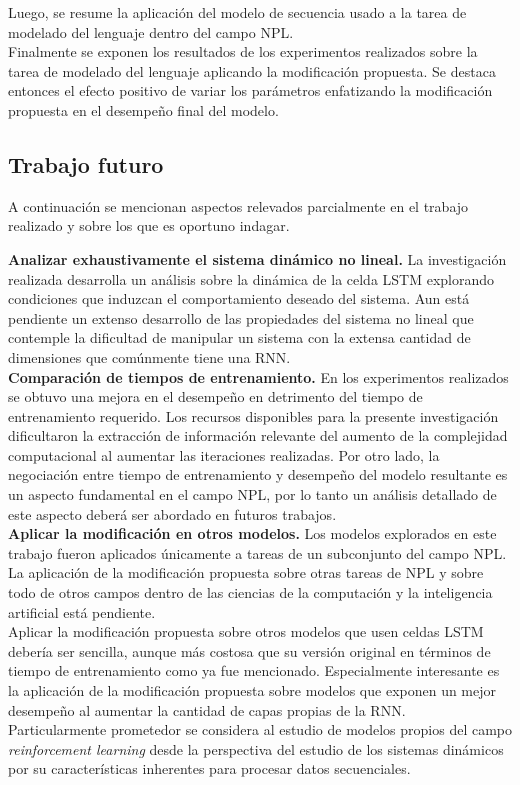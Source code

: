 \documentclass{article}
\begin{document}
	Luego, se resume la aplicación del modelo de secuencia usado a la tarea de modelado del lenguaje dentro del campo NPL.\\
	Finalmente se exponen los resultados de los experimentos realizados sobre la tarea de modelado del lenguaje aplicando la modificación propuesta. Se destaca entonces el efecto positivo de variar los parámetros enfatizando la modificación propuesta en el desempeño final del modelo.\\
	
	\subsection{Trabajo futuro}
	A continuación se mencionan aspectos relevados parcialmente en el trabajo realizado y sobre los que es oportuno indagar.
	
	\textbf{Analizar exhaustivamente el sistema dinámico no lineal.} La investigación realizada desarrolla un análisis sobre la dinámica de la celda LSTM explorando condiciones que induzcan el comportamiento deseado del sistema. Aun está pendiente un extenso desarrollo de las propiedades del sistema no lineal que contemple la dificultad de manipular un sistema con la extensa cantidad de dimensiones que comúnmente tiene una RNN.\\
	
	\textbf{Comparación de tiempos de entrenamiento.} En los experimentos realizados se obtuvo una mejora en el desempeño en detrimento del tiempo de entrenamiento requerido. Los recursos disponibles para la presente investigación dificultaron la extracción de información relevante del aumento de la complejidad computacional al aumentar las iteraciones realizadas. Por otro lado, la negociación entre tiempo de entrenamiento y desempeño del modelo resultante es un aspecto fundamental en el campo NPL, por lo tanto un análisis detallado de este aspecto deberá ser abordado en futuros trabajos.\\
	
	\textbf{Aplicar la modificación en otros modelos.} Los modelos explorados en este trabajo fueron aplicados únicamente a tareas de un subconjunto del campo NPL. La aplicación de la modificación propuesta sobre otras tareas de NPL y sobre todo de otros campos dentro de las ciencias de la computación y la inteligencia artificial está pendiente. \\
	Aplicar la modificación propuesta sobre otros modelos que usen celdas LSTM debería ser sencilla, aunque más costosa que su versión original en términos de tiempo de entrenamiento como ya fue mencionado. Especialmente interesante es la aplicación de la modificación propuesta sobre modelos que exponen un mejor desempeño al aumentar la cantidad de capas propias de la RNN.\\
	Particularmente prometedor se considera al estudio de modelos propios del campo \textit{reinforcement learning} desde la perspectiva del estudio de los sistemas dinámicos por su características inherentes para procesar datos secuenciales.\\
	
\end{document}
